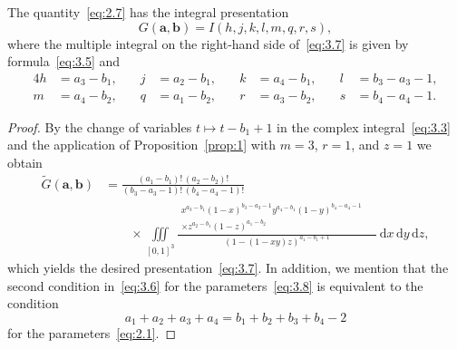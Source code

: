 \documentclass[a4paper,twoside]{article}
\numberwithin{equation}{section}
\renewcommand{\[}{\lfloor}
\renewcommand{\]}{\rfloor}
\newcommand{\<}{\langle}
\renewcommand{\>}{\rangle}
\renewcommand{\d}{\mathrm{d}}
\newcommand{\wt}{\widetilde}
\newcommand{\rom}[1]{{\rm#1}}
\newcommand{\ba}{\boldsymbol a}
\newcommand{\bb}{\boldsymbol b}
\begin{document}
\begin{lemma}
\label{lem:6}
The quantity~\eqref{eq:2.7} has the integral presentation
\begin{equation}
G(\ba,\bb)=I(h,j,k,l,m,q,r,s),
\label{eq:3.7}
\end{equation}
where the multiple integral on the right-hand side of~\eqref{eq:3.7}
is given by formula~\eqref{eq:3.5} and
\begin{equation}
\begin{alignedat}{4}{4}
h&=a_3-b_1, \quad&
j&=a_2-b_1, \quad&
k&=a_4-b_1, \quad&
l&=b_3-a_3-1,
\\
m&=a_4-b_2, \quad&
q&=a_1-b_2, \quad&
r&=a_3-b_2, \quad&
s&=b_4-a_4-1.
\end{alignedat}
\label{eq:3.8}
\end{equation}
\end{lemma}

\begin{proof}
By the change of variables $t\mapsto t-b_1+1$ in the complex
integral~\eqref{eq:3.3} and the application of Proposition~\ref{prop:1}
with $m=3$, $r=1$, and $z=1$ we obtain
\begin{align*}
\wt G(\ba,\bb)
&=\frac{(a_1-b_1)!\,(a_2-b_2)!}{(b_3-a_3-1)!\,(b_4-a_4-1)!}
\\ &\qquad\times
\iiint\limits_{[0,1]^3}
\frac{\begin{aligned}
x^{a_3-b_1}(1-x)^{b_3-a_3-1}y^{a_4-b_1}(1-y)^{b_4-a_4-1}
\quad\; \\[-3.5pt] \times
z^{a_2-b_1}(1-z)^{a_1-b_2}
\end{aligned}}
{(1-(1-xy)z)^{a_1-b_1+1}}\,\d x\,\d y\,\d z,
\end{align*}
which yields the desired presentation~\eqref{eq:3.7}.
In addition\rom, we mention that the second condition
in~\eqref{eq:3.6} for the parameters~\eqref{eq:3.8}
is equivalent to the condition
\begin{equation}
a_1+a_2+a_3+a_4=b_1+b_2+b_3+b_4-2
\label{eq:3.9}
\end{equation}
for the parameters~\eqref{eq:2.1}.
\end{proof}
\end{document}
